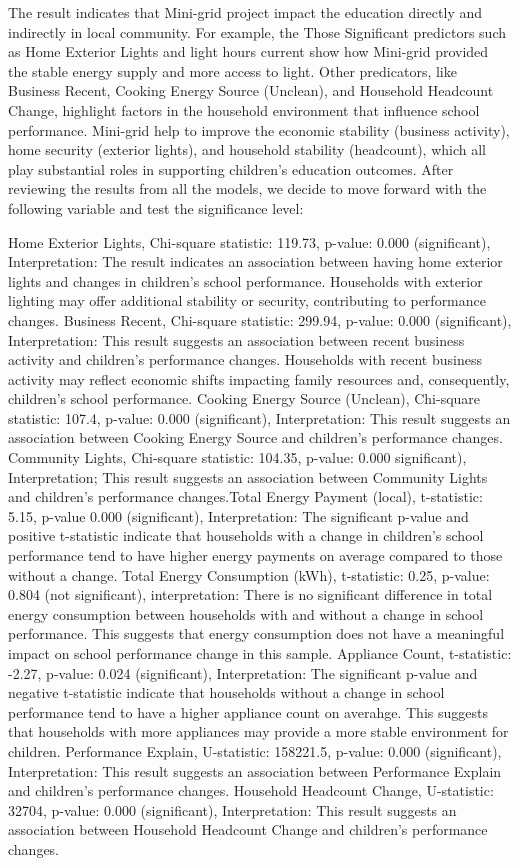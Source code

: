 \documentclass[journal=jacsat,manuscript=article]{achemso}
\begin{document}
The result indicates that Mini-grid project impact the education directly and indirectly in local community. For example, the Those Significant predictors such as Home Exterior Lights and light hours current show how Mini-grid provided the stable energy supply and more access to light. Other predicators, like Business Recent, Cooking Energy Source (Unclean), and Household Headcount Change, highlight factors in the household environment that influence school performance. Mini-grid help to improve the economic stability (business activity), home security (exterior lights), and household stability (headcount), which all play substantial roles in supporting children's education outcomes. After reviewing the results from all the models, we decide to move forward with the following variable and test the significance level:

Home Exterior Lights, Chi-square statistic: 119.73, p-value: 0.000 (significant), Interpretation: The result indicates an association between having home exterior lights and changes in children's school performance. Households with exterior lighting may offer additional stability or security, contributing to performance changes. Business Recent, Chi-square statistic: 299.94, p-value: 0.000 (significant), Interpretation: This result suggests an association between recent business activity and children's performance changes. Households with recent business activity may reflect economic shifts impacting family resources and, consequently, children's school performance. Cooking Energy Source (Unclean), Chi-square statistic: 107.4, p-value: 0.000 (significant), Interpretation: This result suggests an association between Cooking Energy Source and children's performance changes. Community Lights, Chi-square statistic: 104.35, p-value: 0.000 significant), Interpretation; This result suggests an association between Community Lights and children's performance changes.Total Energy Payment (local), t-statistic: 5.15, p-value 0.000 (significant), Interpretation: The significant p-value and positive t-statistic indicate that households with a change in children's school performance tend to have higher energy payments on average compared to those without a change. Total Energy Consumption (kWh), t-statistic: 0.25, p-value: 0.804 (not significant), interpretation: There is no significant difference in total energy consumption between households with and without a change in school performance. This suggests that energy consumption does not have a meaningful impact on school performance change in this sample. Appliance Count, t-statistic: -2.27, p-value: 0.024 (significant), Interpretation: The significant p-value and negative t-statistic indicate that households without a change in school performance tend to have a higher appliance count on averahge. This suggests that households with more appliances may provide a more stable environment for children. Performance Explain, U-statistic: 158221.5, p-value: 0.000 (significant), Interpretation: This result suggests an association between Performance Explain and children's performance changes. Household Headcount Change, U-statistic: 32704, p-value: 0.000 (significant), Interpretation: This result suggests an association between Household Headcount Change and children's performance changes.
\end{document}
